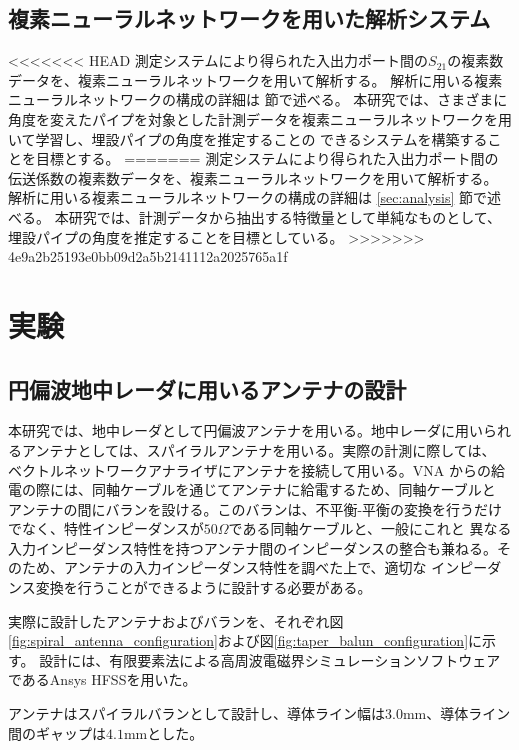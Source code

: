 \documentclass[11pt,a4paper,uplatex]{ujarticle}
\begin{document}
  \newpage

  \subsection{複素ニューラルネットワークを用いた解析システム}

<<<<<<< HEAD
    測定システムにより得られた入出力ポート間の$S_{21}$の複素数データを、複素ニューラルネットワークを用いて解析する。
    解析に用いる複素ニューラルネットワークの構成の詳細は \label{sec:analysis} 節で述べる。
    本研究では、さまざまに角度を変えたパイプを対象とした計測データを複素ニューラルネットワークを用いて学習し、埋設パイプの角度を推定することの
    できるシステムを構築することを目標とする。
=======
    測定システムにより得られた入出力ポート間の伝送係数の複素数データを、複素ニューラルネットワークを用いて解析する。
    解析に用いる複素ニューラルネットワークの構成の詳細は \ref{sec:analysis} 節で述べる。
    本研究では、計測データから抽出する特徴量として単純なものとして、埋設パイプの角度を推定することを目標としている。
>>>>>>> 4e9a2b25193e0bb09d2a5b2141112a2025765a1f

\section{実験}

  \subsection{円偏波地中レーダに用いるアンテナの設計}

  本研究では、地中レーダとして円偏波アンテナを用いる。地中レーダに用いられるアンテナとしては、スパイラルアンテナを用いる。実際の計測に際しては、
  ベクトルネットワークアナライザにアンテナを接続して用いる。VNA からの給電の際には、同軸ケーブルを通じてアンテナに給電するため、同軸ケーブルと
  アンテナの間にバランを設ける。このバランは、不平衡-平衡の変換を行うだけでなく、特性インピーダンスが$50\Omega$である同軸ケーブルと、一般にこれと
  異なる入力インピーダンス特性を持つアンテナ間のインピーダンスの整合も兼ねる。そのため、アンテナの入力インピーダンス特性を調べた上で、適切な
  インピーダンス変換を行うことができるように設計する必要がある。

  実際に設計したアンテナおよびバランを、それぞれ図\ref{fig:spiral_antenna_configuration}および図\ref{fig:taper_balun_configuration}に示す。
  設計には、有限要素法による高周波電磁界シミュレーションソフトウェアであるAnsys HFSSを用いた。

  アンテナはスパイラルバランとして設計し、導体ライン幅は$3.0\mathrm{mm}$、導体ライン間のギャップは$4.1\mathrm{mm}$とした。
  
\end{document}
